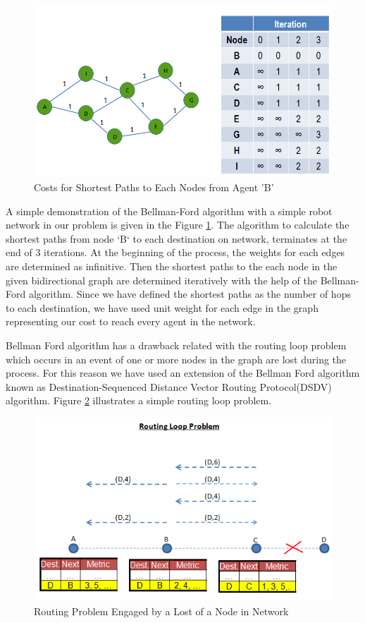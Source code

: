 \begin{figure}[H]
\caption{Costs for Shortest Paths to Each Nodes from Agent 'B'} \label{bellman_ref}
\centering
\includegraphics[scale = 0.50]{bellman}
\end{figure}

A simple demonstration of the Bellman-Ford algorithm with a simple robot network in our problem is given in the Figure \ref{bellman_ref}. The algorithm to calculate the shortest paths from node `B` to each destination on network, terminates at the end of 3 iterations. At the beginning of the process, the weights for each edges are determined as infinitive. Then the shortest paths to the each node in the given bidirectional graph are determined iteratively with the help of the Bellman-Ford algorithm. Since we have defined the shortest paths as the number of hops to each destination, we have used unit weight for each edge in the graph representing our cost to reach every agent in the network. 

Bellman Ford algorithm has a drawback related with the routing loop problem which occurs in an event of one or more nodes in the graph are lost during the process. For this reason we have used an extension of the Bellman Ford algorithm known as Destination-Sequenced Distance Vector Routing Protocol(DSDV) algorithm. Figure \ref{routing_problem2} illustrates a simple routing loop problem.

\begin{figure}[H] 
\caption{Routing Problem Engaged by a Lost of a Node in Network} \label{routing_problem2}
\centering
\includegraphics[scale = 0.65]{routing_problem}
\end{figure}

